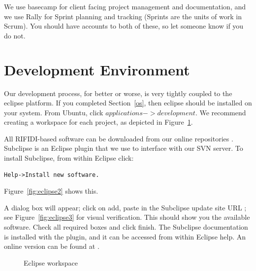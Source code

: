 \documentclass[11pt]{article}
\begin{document}
We use basecamp \cite{basecamp} for client facing project management and documentation, and we use Rally \cite{rallydev} for Sprint planning and tracking (Sprints are the units of work in Scrum).  You should have accounts to both of these, so let someone know if you do not.

\section{Development Environment}

Our development process, for better or worse, is very tightly coupled to the eclipse\cite{eclipse} platform.  If you completed Section~\ref{os}, then eclipse should be installed on your system.  From Ubuntu, click $applications->development$.  We recommend creating a workspace for each project, as depicted in Figure~\ref{fig:eclipse1}.

All RIFIDI-based software can be downloaded from our online repositories \cite{rep-edge, rep-external, rep-internal, rep-ambient}.  Subclipse \cite{subclipse} is an Eclipse plugin that we use to interface with our SVN server.  To install Subclipse, from within Eclipse click: \begin{verbatim}Help->Install new software.\end{verbatim}  Figure~\ref{fig:eclipse2} shows this.

A dialog box will appear; click on add, paste in the Subclipse update site URL \cite{subclipse-update}; see Figure~\ref{fig:eclipse3} for visual verification.  This should show you the available software.  Check all required boxes and click finish.  The Subclipse documentation is installed with the plugin, and it can be accessed from within Eclipse help.  An online version can be found at \cite{subclipse-doc}.

\begin{figure}
\caption{\label{fig:eclipse1} Eclipse workspace}
\end{figure}
\end{document}
